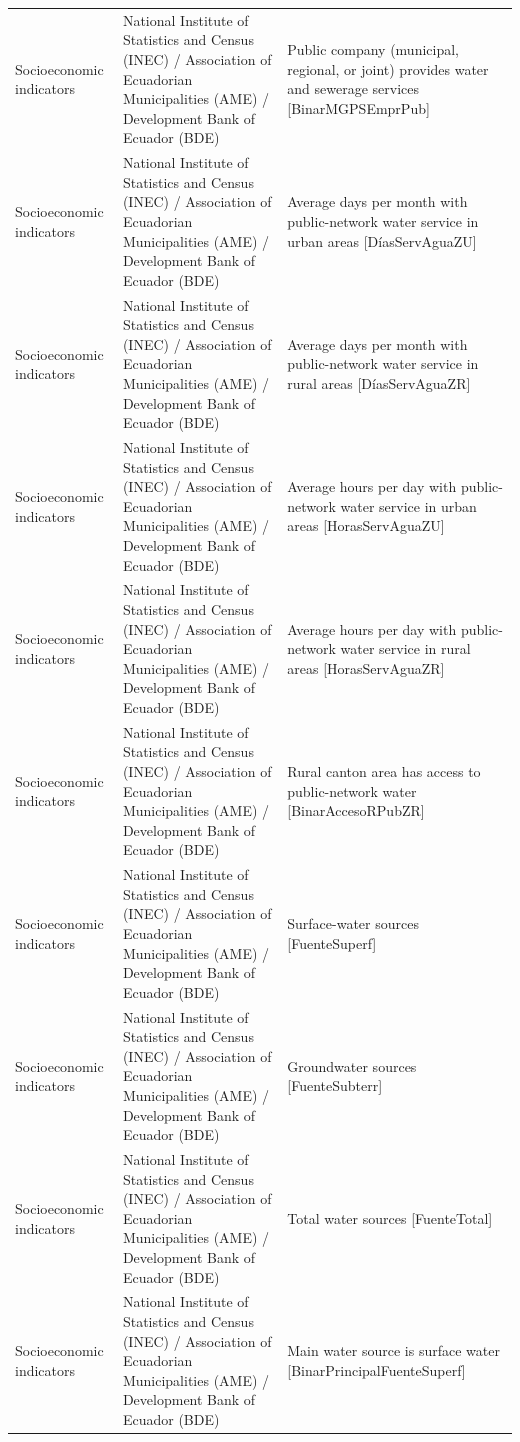 \documentclass[10pt,a4paper]{article}
\begin{document}
\begin{longtable}{@{}>{\raggedright\arraybackslash}p{3.5cm}>{\raggedright\arraybackslash}p{5.6cm}>{\raggedright\arraybackslash}p{\dimexpr\textwidth-9.1cm-4\tabcolsep\relax}@{}}
Socioeconomic indicators & National Institute of Statistics and Census (INEC) / Association of Ecuadorian Municipalities (AME) / Development Bank of Ecuador (BDE) & Public company (municipal, regional, or joint) provides water and sewerage services [BinarMGPSEmprPub]\\
Socioeconomic indicators & National Institute of Statistics and Census (INEC) / Association of Ecuadorian Municipalities (AME) / Development Bank of Ecuador (BDE) & Average days per month with public-network water service in urban areas [D\'{i}asServAguaZU]\\
Socioeconomic indicators & National Institute of Statistics and Census (INEC) / Association of Ecuadorian Municipalities (AME) / Development Bank of Ecuador (BDE) & Average days per month with public-network water service in rural areas [D\'{i}asServAguaZR]\\
Socioeconomic indicators & National Institute of Statistics and Census (INEC) / Association of Ecuadorian Municipalities (AME) / Development Bank of Ecuador (BDE) & Average hours per day with public-network water service in urban areas [HorasServAguaZU]\\
Socioeconomic indicators & National Institute of Statistics and Census (INEC) / Association of Ecuadorian Municipalities (AME) / Development Bank of Ecuador (BDE) & Average hours per day with public-network water service in rural areas [HorasServAguaZR]\\
Socioeconomic indicators & National Institute of Statistics and Census (INEC) / Association of Ecuadorian Municipalities (AME) / Development Bank of Ecuador (BDE) & Rural canton area has access to public-network water [BinarAccesoRPubZR]\\
Socioeconomic indicators & National Institute of Statistics and Census (INEC) / Association of Ecuadorian Municipalities (AME) / Development Bank of Ecuador (BDE) & Surface-water sources [FuenteSuperf]\\
Socioeconomic indicators & National Institute of Statistics and Census (INEC) / Association of Ecuadorian Municipalities (AME) / Development Bank of Ecuador (BDE) & Groundwater sources [FuenteSubterr]\\
Socioeconomic indicators & National Institute of Statistics and Census (INEC) / Association of Ecuadorian Municipalities (AME) / Development Bank of Ecuador (BDE) & Total water sources [FuenteTotal]\\
Socioeconomic indicators & National Institute of Statistics and Census (INEC) / Association of Ecuadorian Municipalities (AME) / Development Bank of Ecuador (BDE) & Main water source is surface water [BinarPrincipalFuenteSuperf]\\

\end{longtable}
\end{document}
